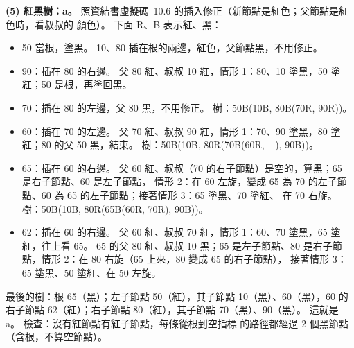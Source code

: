 \begin{pastsoln}
\textbf{(5) 紅黑樹：a。} 照資結書虛擬碼~10.6 的插入修正（新節點是紅色；父節點是紅色時，看叔叔的
顏色）。 下面 R、B 表示紅、黑：
\begin{itemize}
\item 50 當根，塗黑。 10、80 插在根的兩邊，紅色，父節點黑，不用修正。
\item 90：插在 80 的右邊。 父 80 紅、叔叔 10 紅，情形 1：80、10 塗黑，50 塗紅；50 是根，再塗回黑。
\item 70：插在 80 的左邊，父 80 黑，不用修正。 樹：50B(10B, 80B(70R, 90R))。
\item 60：插在 70 的左邊。 父 70 紅、叔叔 90 紅，情形 1：70、90 塗黑，80 塗紅；80 的父 50 黑，結束。
樹：50B(10B, 80R(70B(60R, $-$), 90B))。
\item 65：插在 60 的右邊。 父 60 紅、叔叔（70 的右子節點）是空的，算黑；65 是右子節點、60 是左子節點，
情形 2：在 60 左旋，變成 65 為 70 的左子節點、60 為 65 的左子節點；接著情形 3：65 塗黑、70 塗紅、
在 70 右旋。 樹：50B(10B, 80R(65B(60R, 70R), 90B))。
\item 62：插在 60 的右邊。 父 60 紅、叔叔 70 紅，情形 1：60、70 塗黑，65 塗紅，往上看 65。 65 的父 80
紅、叔叔 10 黑；65 是左子節點、80 是右子節點，情形 2：在 80 右旋（65 上來，80 變成 65 的右子節點），
接著情形 3：65 塗黑、50 塗紅、在 50 左旋。
\end{itemize}
最後的樹：根 65（黑）；左子節點 50（紅），其子節點 10（黑）、60（黑），60 的右子節點 62（紅）；右子節點
80（紅），其子節點 70（黑）、90（黑）。 這就是 a。 檢查：沒有紅節點有紅子節點，每條從根到空指標
的路徑都經過 $2$ 個黑節點（含根，不算空節點）。
\end{pastsoln}
